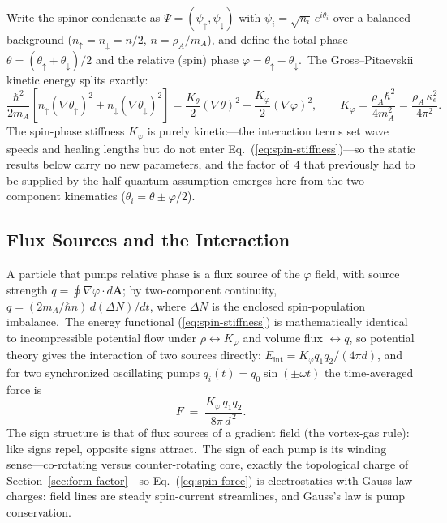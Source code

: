 \documentclass[12pt,letterpaper]{article}
\newcommand{\rhoa}{\rho_{\!A}}
\begin{document}
Write the spinor condensate as $\Psi = (\psi_\uparrow, \psi_\downarrow)$
with $\psi_i = \sqrt{n_i}\,e^{i\theta_i}$ over a balanced background
($n_\uparrow = n_\downarrow = n/2$, $n = \rhoa/m_A$), and define the
total phase $\theta = (\theta_\uparrow + \theta_\downarrow)/2$ and the
relative (spin) phase $\varphi = \theta_\uparrow - \theta_\downarrow$.\
The Gross--Pitaevskii kinetic energy splits exactly:
%
\begin{equation}
  \frac{\hbar^2}{2 m_A}\!\left[n_\uparrow(\nabla\theta_\uparrow)^2
  + n_\downarrow(\nabla\theta_\downarrow)^2\right]
  = \frac{K_\theta}{2}(\nabla\theta)^2
  + \frac{K_\varphi}{2}(\nabla\varphi)^2,
  \qquad
  K_\varphi = \frac{\rhoa \hbar^2}{4 m_A^2}
            = \frac{\rhoa\,\kappa_e^2}{4\pi^2}.
  \label{eq:spin-stiffness}
\end{equation}
%
The spin-phase stiffness $K_\varphi$ is purely kinetic---the interaction
terms set wave speeds and healing lengths but do not enter
Eq.~(\ref{eq:spin-stiffness})---so the static results below carry no new
parameters, and the factor of~$4$ that previously had to be supplied by
the half-quantum assumption emerges here from the two-component
kinematics ($\theta_i = \theta \pm \varphi/2$).

\subsection{Flux Sources and the Interaction}
\label{sec:spin-force}

A particle that pumps relative phase is a flux source of the $\varphi$
field, with source strength
$q = \oint \nabla\varphi \cdot d\mathbf{A}$; by two-component
continuity, $q = (2 m_A/\hbar n)\,d(\Delta N)/dt$, where $\Delta N$ is
the enclosed spin-population imbalance.\ The energy functional
(\ref{eq:spin-stiffness}) is mathematically identical to incompressible
potential flow under $\rho \leftrightarrow K_\varphi$ and volume flux
$\leftrightarrow q$, so potential theory gives the interaction of two
sources directly: $E_{\mathrm{int}} = K_\varphi q_1 q_2/(4\pi d)$, and
for two synchronized oscillating pumps $q_i(t) = q_0 \sin(\pm\omega t)$
the time-averaged force is
%
\begin{equation}
  F \;=\; \frac{K_\varphi\, q_1 q_2}{8\pi\, d^{\,2}}.
  \label{eq:spin-force}
\end{equation}
%
The sign structure is that of flux sources of a gradient field (the
vortex-gas rule): like signs repel, opposite signs attract.\ The sign of
each pump is its winding sense---co-rotating versus counter-rotating
core, exactly the topological charge of
Section~\ref{sec:form-factor}---so Eq.~(\ref{eq:spin-force}) is
electrostatics with Gauss-law charges: field lines are steady
spin-current streamlines, and Gauss's law is pump conservation.
\end{document}
